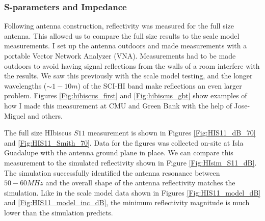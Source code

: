 \subsubsection{S-parameters and Impedance}\label{Sec:HIbiscus_Imp}

Following antenna construction, reflectivity was measured for the full size antenna. This allowed us to compare the full size results to the scale model measurements. I set up the antenna outdoors and made measurements with a portable Vector Network Analyzer (VNA). Measurements had to be made outdoors to avoid having signal reflections from the walls of a room interfere with the results. We saw this previously with the scale model testing, and the longer wavelengths ($\sim 1-10 m$) of the SCI-HI band make reflections an even larger problem. Figures \ref{Fig:hibiscus_first} and \ref{Fig:hibiscus_gbt} show examples of how I made this measurement at CMU and Green Bank with the help of Jose-Miguel and others.

The full size HIbiscus $S11$ measurement is shown in Figures \ref{Fig:HIS11_dB_70} and \ref{Fig:HIS11_Smith_70}. Data for the figures was collected on-site at Isla Guadalupe with the antenna ground plane in place. We can compare this measurement to the simulated reflectivity shown in Figure \ref{Fig:HIsim_S11_dB}. The simulation successfully identified the antenna resonance between $50-60 MHz$ and the overall shape of the antenna reflectivity matches the simulation. Like in the scale model data shown in Figures \ref{Fig:HIS11_model_dB} and \ref{Fig:HIS11_model_inc_dB}, the minimum reflectivity magnitude is much lower than the simulation predicts. 

